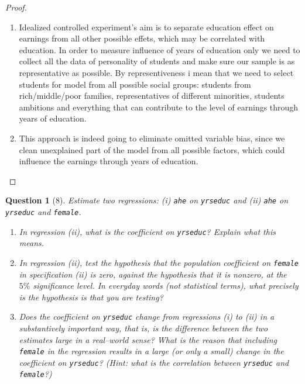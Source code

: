 \documentclass[12pt,reqno]{amsart}
\theoremstyle{plain}
\newtheorem*{theorem*}{Question}
\begin{document}
\begin{proof}
    \begin{enumerate}
        \item Idealized controlled experiment's aim is to separate education effect on earnings from all
              other possible effets, which may be correlated with education. In order to measure influence of
              years of education only we need to collect all the data of personality of students and make sure
              our sample is as representative as possible. By representiveness i mean that we need to select
              students for model from all possible social groups: students from rich/middle/poor families,
              representatives of different minorities, students ambitions and everything that can contribute
              to the level of earnings through years of education.
        \item This approach is indeed going to eliminate omitted variable bias, since we clean
              unexplained part of the model from all possible factors, which could influence the earnings through
              years of education.
    \end{enumerate}
\end{proof}
\begin{theorem*}[8]
    \normalfont
    Estimate two regressions: (i) \texttt{ahe} on \texttt{yrseduc} and (ii) \texttt{ahe} on \texttt{yrseduc} and \texttt{female}.
    \begin{enumerate}
        \item  In regression (ii), what is the coefficient on \texttt{yrseduc}? Explain what this means.
        \item  In regression (ii), test the hypothesis that the population coefficient on \texttt{female}
              in specification (ii) is zero, against the hypothesis that it is nonzero, at the $ 5\% $ significance
              level. In everyday words (not statistical terms), what precisely is the hypothesis is that you are testing?
        \item  Does the coefficient on \texttt{yrseduc} change from regressions (i) to (ii) in a
              substantively important way, that is, is the difference between the two estimates large in a
              real--world sense? What is the reason that including \texttt{female} in the regression
              results in a large (or only a small) change in the coefficient on \texttt{yrseduc}?
              (Hint: what is the correlation between \texttt{yrseduc} and \texttt{female}?)

    \end{enumerate}
\end{theorem*}
\end{document}
